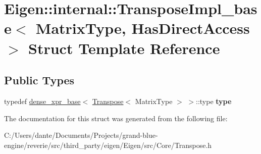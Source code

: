 \hypertarget{struct_eigen_1_1internal_1_1_transpose_impl__base}{}\section{Eigen\+::internal\+::Transpose\+Impl\+\_\+base$<$ Matrix\+Type, Has\+Direct\+Access $>$ Struct Template Reference}
\label{struct_eigen_1_1internal_1_1_transpose_impl__base}
\subsection*{Public Types}
\begin{DoxyCompactItemize}
\item 
\mbox{\label{struct_eigen_1_1internal_1_1_transpose_impl__base_aeda2dc3dbe38d55d64d6bfa76ee19396}} 
typedef \mbox{\hyperlink{struct_eigen_1_1internal_1_1dense__xpr__base}{dense\+\_\+xpr\+\_\+base}}$<$ \mbox{\hyperlink{class_eigen_1_1_transpose}{Transpose}}$<$ Matrix\+Type $>$ $>$\+::type {\bfseries type}
\end{DoxyCompactItemize}


The documentation for this struct was generated from the following file\+:\begin{DoxyCompactItemize}
\item 
C\+:/\+Users/dante/\+Documents/\+Projects/grand-\/blue-\/engine/reverie/src/third\+\_\+party/eigen/\+Eigen/src/\+Core/Transpose.\+h\end{DoxyCompactItemize}
